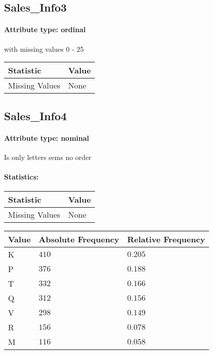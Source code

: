 \subsection{Sales\_Info3}
\paragraph{Attribute type: ordinal} with missing values 0 - 25

\qquad
\begin{table}[H]
	\renewcommand{\arraystretch}{1.25}
	\begin{tabular}{l|l}
		\textbf{Statistic} & \textbf{Value}\\\hline
		Missing Values& None\\\hline
	\end{tabular}
\end{table}

\subsection{Sales\_Info4}
\paragraph{Attribute type: nominal} Is only letters sems no order
\paragraph{Statistics: }
\begin{table}[H]
	\renewcommand{\arraystretch}{1.25}
	\begin{tabular}{l|l}
		\textbf{Statistic} & \textbf{Value}\\\hline
		Missing Values& None\\\hline
	\end{tabular}
\end{table}
\begin{table}[H]
	\renewcommand{\arraystretch}{1.25}
	\begin{tabular}{l|l|l}
		\textbf{Value} & \textbf{Absolute Frequency} & \textbf{Relative Frequency}\\\hline
		K&$410$&$0.205$\\\hline
		P&$376$&$0.188$\\\hline
		T&$332$&$0.166$\\\hline
		Q&$312$&$0.156$\\\hline
		V&$298$&$0.149$\\\hline
		R&$156$&$0.078$\\\hline
		M&$116$&$0.058$
	\end{tabular}
\end{table}

